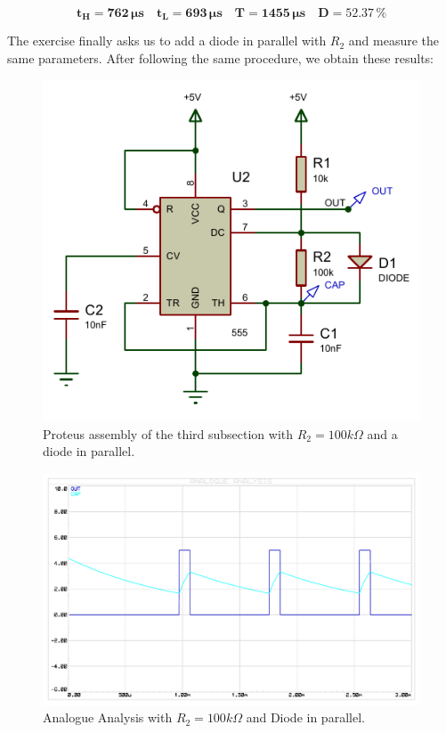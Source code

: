\documentclass[a4paper, 11pt, oneside]{article}
\begin{document}
\vspace{-.4cm}

\begin{equation*}
    \mathbf{t_H} = \mathbf{762 \, \si\micro \text{s}} \quad
    \mathbf{t_L} = \mathbf{693 \, \si\micro \text{s}} \quad
    \mathbf{T} = \mathbf{1455 \, \si\micro \text{s}} \quad
    \mathbf{D} =  \mathbf{52.37 \, \text{\%}}
\end{equation*}
\clearpage


The exercise finally asks us to add a diode in parallel with $R_2$ and measure the same parameters. After following the same procedure, we obtain these results:

\begin{figure}[H]
    \centering
    \includegraphics[scale = 1.1]{Graphics/Practice 2/GRAPHICS/555/GRAPHS/PROTEUS/ASSEMBLY/555_ASTABLE_100K_DIODE_ASSEMBLY.PDF}
    \caption{Proteus assembly of the third subsection with $R_2 = 100k \Omega$ and a diode in parallel.}
    \label{fig:555_100K_DIODE}
\end{figure}


\begin{figure}[H]
    \centering
    \includegraphics[scale = 0.8]{Graphics/Practice 2/GRAPHICS/555/GRAPHS/PROTEUS/ANALOGUE/555_ASTABLE_ANALOGUE_100K_DIODE.PDF}
    \caption{Analogue Analysis with $R_2 = 100k\Omega$ and Diode in parallel.}
    \label{fig:555_ANALOGUE_100K_DIODE}
\end{figure}
\end{document}
